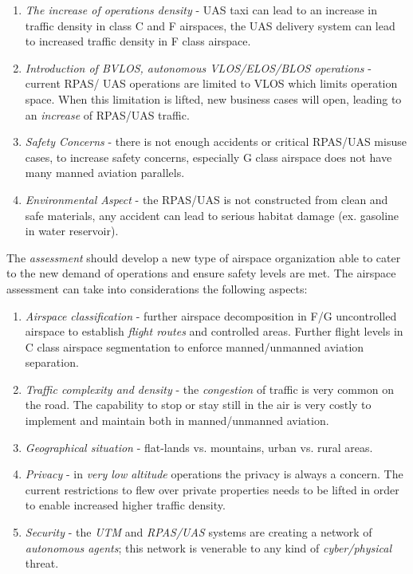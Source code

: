\begin{enumerate}
    \item \emph{The increase of operations density} - UAS taxi can lead to an increase in traffic density in class C and F airspaces, the UAS delivery system can lead to increased traffic density in F class airspace. 
    
    \item \emph{Introduction of BVLOS, autonomous VLOS/ELOS/BLOS operations} - current RPAS/ UAS operations are limited to VLOS which limits operation space. When this limitation is lifted, new business cases will open, leading to an \emph{increase} of RPAS/UAS traffic.
    
    \item \emph{Safety Concerns} - there is not enough accidents or critical RPAS/UAS misuse cases, to increase safety concerns, especially G class airspace does not have many manned aviation parallels.
    
    \item \emph{Environmental Aspect} - the RPAS/UAS is not constructed from clean and safe materials, any accident can lead to serious habitat damage (ex. gasoline in water reservoir).
\end{enumerate}

The \emph{assessment} should develop a new type of airspace organization able to cater to the new demand of operations and ensure safety levels are met. The airspace assessment can take into considerations the following aspects:

\begin{enumerate}
    \item \emph{Airspace classification} - further airspace decomposition in F/G  uncontrolled airspace to establish \emph{flight routes} and controlled areas. Further flight levels in C class airspace segmentation to enforce manned/unmanned aviation separation.
    
    \item \emph{Traffic complexity and density} - the \emph{congestion} of traffic is very common on the road. The capability to stop or stay still in the air is very costly to implement and maintain both in manned/unmanned aviation.
    
    \item \emph{Geographical situation} - flat-lands vs. mountains, urban vs. rural areas.
    
    \item \emph{Privacy} - in \emph{very low altitude} operations the privacy is always a concern.  The current restrictions to flew over private properties needs to be lifted in order to enable increased higher traffic density.
    
    \item \emph{Security} - the \emph{UTM} and \emph{RPAS/UAS} systems are creating a network of \emph{autonomous agents}; this network is venerable to any kind of \emph{cyber/physical} threat.
\end{enumerate}

